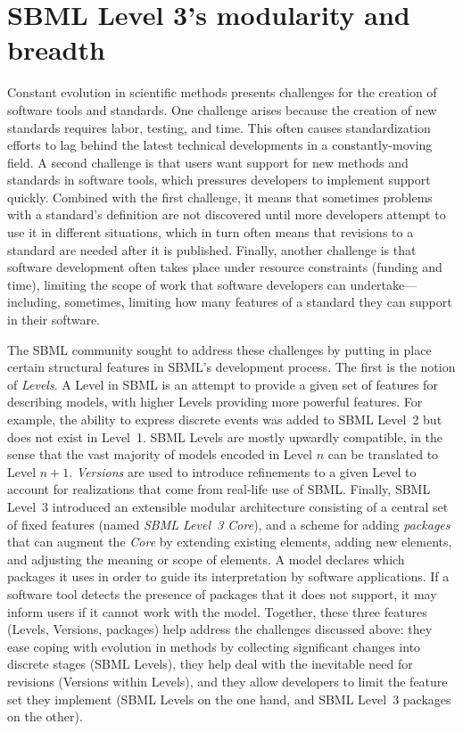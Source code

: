 \documentclass{sbml-paper}
\begin{document}
\section*{SBML Level 3's modularity and breadth}\label{sec:modularity}

Constant evolution in scientific methods presents challenges for the creation of software tools and standards.  One challenge arises because the creation of new standards requires labor, testing, and time.  This often causes standardization efforts to lag behind the latest technical developments in a constantly-moving field.  A second challenge is that users want support for new methods and standards in software tools, which pressures developers to implement support quickly.  Combined with the first challenge, it means that sometimes problems with a standard's definition are not discovered until more developers attempt to use it in different situations, which in turn often means that revisions to a standard are needed after it is published.  Finally, another challenge is that software development often takes place under resource constraints (\eg funding and time), limiting the scope of work that software developers can undertake---including, sometimes, limiting how many features of a standard they can support in their software.

The SBML community sought to address these challenges by putting in place certain structural features in SBML's development process.  The first is the notion of \emph{Levels}.  A Level in SBML is an attempt to provide a given set of features for describing models, with higher Levels providing more powerful features.  For example, the ability to express discrete events was added to SBML Level~2 but does not exist in Level~1.  SBML Levels are mostly upwardly compatible, in the sense that the vast majority of models encoded in Level $n$ can be translated to Level $n+1$.  \emph{Versions} are used to introduce refinements to a given Level to account for realizations that come from real-life use of SBML.  Finally, SBML Level~3 introduced an extensible modular architecture consisting of a central set of fixed features (named \emph{SBML Level~3 Core}), and a scheme for adding \emph{packages} that can augment the \emph{Core} by extending existing elements, adding new elements, and adjusting the meaning or scope of elements.  A model declares which packages it uses in order to guide its interpretation by software applications.  If a software tool detects the presence of packages that it does not support, it may inform users if it cannot work with the model.  Together, these three features (Levels, Versions, packages) help address the challenges discussed above: they ease coping with evolution in methods by collecting significant changes into discrete stages (SBML Levels), they help deal with the inevitable need for revisions (Versions within Levels), and they allow developers to limit the feature set they implement (SBML Levels on the one hand, and SBML Level~3 packages on the other).
\end{document}
